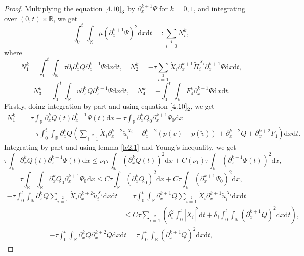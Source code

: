 \documentclass[10pt,reqno]{amsart}
\numberwithin{equation}{section}
\newcommand{\dif}{\mathrm{d}}
\begin{document}
\begin{proof}
Multiplying the equation $\eqref{4.10}_3$ by $\partial_{x}^{k+1}\Psi$ for $k=0 , 1$, and integrating over $(0,t)\times\mathbb{R}$, we get
\[
\int_0^t\int_{\mathbb{R}}\mu\left(\partial_{x}^{k+1}\Psi\right)^2\dif x \dif t
=:\sum\limits_{i=0}\limits^{4}N_i^k,
\]
where
\[
N_1^k=\int_0^t\int_\mathbb{R}\tau\partial_{t}\partial_{x}^kQ\partial_{x}^{k+1}\Psi \dif x \dif t,
\quad
N_2^k=-\tau\sum\limits_{i=1}\limits^2\dot{X}_i\partial_x^{k+1}\widetilde{\Pi}_i^{X_i}\partial_{x}^{k+1}\Psi\dif x\dif t,
\]
\[
N_3^k=\int_0^t\int_\mathbb{R}v\partial_{x}^{k}Q\partial_{x}^{k+1}\Psi \dif x \dif t,
\quad N_4^k=-\int_0^t\int_\mathbb{R}F_4^k\partial_{x}^{k+1}\Psi \dif x \dif t.
\]
Firstly, doing integration by part and using equation $\eqref{4.10}_2$, we get
\begin{align*}
N_1^k=&\tau\int_\mathbb{R}\partial_{x}^kQ(t)\partial_{x}^{k+1}\Psi(t) \dif x-\tau\int_\mathbb{R}\partial_{x}^kQ_0\partial_{x}^{k+1}\Psi_0 \dif x\\
      &-\tau\int_0^t\int_\mathbb{R}\partial_{x}^kQ
      \left(\sum\limits_{i=1}\limits^2\dot{X}_i\partial_{x}^{k+2}\widetilde{u}_i^{X_i}
      -\partial_{x}^{k+2}(p(v)-p(\widetilde{v}))+\partial_{x}^{k+2}Q+\partial_{x}^{k+2}F_1\right)\dif x \dif t.
\end{align*}
Integrating by part and using lemma \ref{le2.1} and Young's inequality, we get
\[
	\tau\int_\mathbb{R}\partial_{x}^kQ(t)\partial_{x}^{k+1}\Psi(t) \dif x\leq 	\nu_1\tau\int_\mathbb{R}(\partial_{x}^kQ(t))^2 \dif x
	+C(\nu_1)\tau\int_\mathbb{R}(\partial_{x}^{k+1}\Psi(t))^2 \dif x,
	\]
	\[
	\tau\int_\mathbb{R}\int_\mathbb{R}\partial_{x}^kQ_0\partial_{x}^{k+1}\Psi_0 \dif x\leq C\tau\int_\mathbb{R}(\partial_{x}^kQ_0)^2 \dif x
	+C\tau\int_\mathbb{R}(\partial_{x}^{k+1}\Psi_0)^2 \dif x,
	\]
\begin{align*}
-\tau\int_0^t\int_\mathbb{R}\partial_{x}^kQ
     \sum\limits_{i=1}\limits^2\dot{X}_i\partial_{x}^{k+2}\widetilde{u}_i^{X_i}\dif x \dif t
&=\tau\int_0^t\int_\mathbb{R}\partial_{x}^{k+1}Q
     \sum\limits_{i=1}\limits^2\dot{X}_i\partial_{x}^{k+1}\widetilde{u}_i^{X_i}\dif x \dif t\\
&\le C\tau\sum\limits_{i=1}\limits^2\left(\delta_i^2\int_0^t|\dot{X}_i|^2\dif t
+\delta_i\int_0^t\int_\mathbb{R}(\partial_{x}^{k+1}Q)^2 \dif x\dif t\right),
\end{align*}
\begin{align*}
-\tau\int_0^t\int_\mathbb{R}\partial_{x}^kQ\partial_{x}^{k+2}Q\dif x \dif t
=\tau\int_0^t\int_\mathbb{R}\left(\partial_{x}^{k+1}Q\right)^2\dif x \dif t,

\end{align*}
\end{proof}
\end{document}
